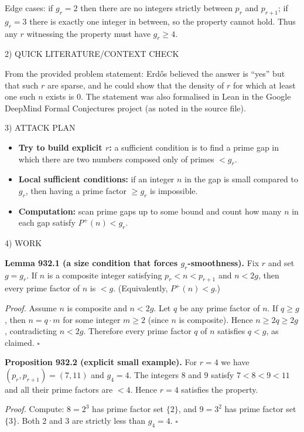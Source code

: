 Edge cases: if $g_r=2$ then there are no integers strictly between $p_r$ and $p_{r+1}$; if $g_r=3$ there is exactly one integer in between, so the property cannot hold. Thus any $r$ witnessing the property must have $g_r\ge 4$.

2) QUICK LITERATURE/CONTEXT CHECK

From the provided problem statement: Erd\H{o}s believed the answer is ``yes'' but that such $r$ are sparse, and he could show that the density of $r$ for which at least one such $n$ exists is $0$. The statement was also formalised in Lean in the Google DeepMind Formal Conjectures project (as noted in the source file).

3) ATTACK PLAN

\begin{itemize}
\item \textbf{Try to build explicit $r$:} a sufficient condition is to find a prime gap in which there are two numbers composed only of primes $<g_r$.
\item \textbf{Local sufficient conditions:} if an integer $n$ in the gap is small compared to $g_r$, then having a prime factor $\ge g_r$ is impossible.
\item \textbf{Computation:} scan prime gaps up to some bound and count how many $n$ in each gap satisfy $P^+(n)<g_r$.
\end{itemize}

4) WORK

\textbf{Lemma 932.1 (a size condition that forces $g_r$-smoothness).}
Fix $r$ and set $g=g_r$.
If $n$ is a composite integer satisfying $p_r<n<p_{r+1}$ and $n<2g$, then every prime factor of $n$ is $<g$. (Equivalently, $P^+(n)<g$.)

\emph{Proof.}
Assume $n$ is composite and $n<2g$.
Let $q$ be any prime factor of $n$. If $q\ge g$, then $n=q\cdot m$ for some integer $m\ge 2$ (since $n$ is composite). Hence $n\ge 2q\ge 2g$, contradicting $n<2g$.
Therefore every prime factor $q$ of $n$ satisfies $q<g$, as claimed.
\hfill$\square$

\medskip
\textbf{Proposition 932.2 (explicit small example).}
For $r=4$ we have $(p_r,p_{r+1})=(7,11)$ and $g_4=4$. The integers $8$ and $9$ satisfy $7<8<9<11$ and all their prime factors are $<4$. Hence $r=4$ satisfies the property.

\emph{Proof.}
Compute: $8=2^3$ has prime factor set $\{2\}$, and $9=3^2$ has prime factor set $\{3\}$. Both $2$ and $3$ are strictly less than $g_4=4$.
\hfill$\square$

